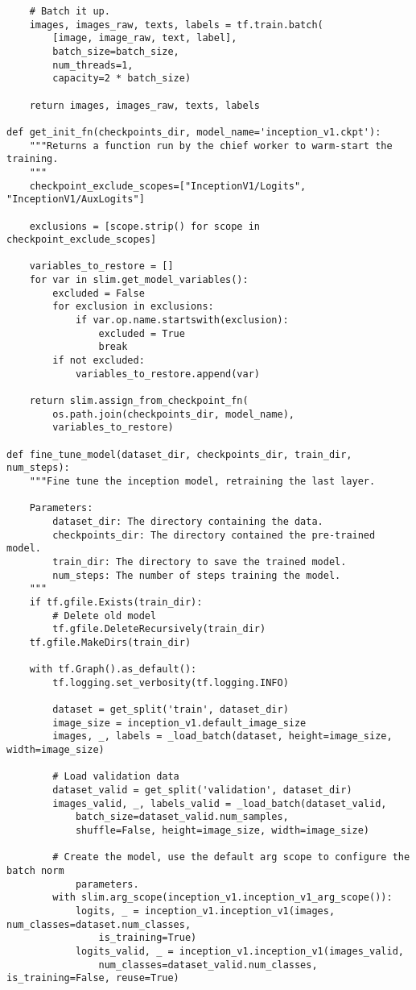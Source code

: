 \begin{lstlisting}
    # Batch it up.
    images, images_raw, texts, labels = tf.train.batch(
        [image, image_raw, text, label],
        batch_size=batch_size,
        num_threads=1,
        capacity=2 * batch_size)
    
    return images, images_raw, texts, labels

def get_init_fn(checkpoints_dir, model_name='inception_v1.ckpt'):
    """Returns a function run by the chief worker to warm-start the training.
    """
    checkpoint_exclude_scopes=["InceptionV1/Logits", "InceptionV1/AuxLogits"]
    
    exclusions = [scope.strip() for scope in checkpoint_exclude_scopes]

    variables_to_restore = []
    for var in slim.get_model_variables():
        excluded = False
        for exclusion in exclusions:
            if var.op.name.startswith(exclusion):
                excluded = True
                break
        if not excluded:
            variables_to_restore.append(var)

    return slim.assign_from_checkpoint_fn(
        os.path.join(checkpoints_dir, model_name),
        variables_to_restore)

def fine_tune_model(dataset_dir, checkpoints_dir, train_dir, num_steps):
    """Fine tune the inception model, retraining the last layer.

    Parameters:
        dataset_dir: The directory containing the data.
        checkpoints_dir: The directory contained the pre-trained model.
        train_dir: The directory to save the trained model.
        num_steps: The number of steps training the model.
    """
    if tf.gfile.Exists(train_dir):
        # Delete old model
        tf.gfile.DeleteRecursively(train_dir)
    tf.gfile.MakeDirs(train_dir)

    with tf.Graph().as_default():
        tf.logging.set_verbosity(tf.logging.INFO)
        
        dataset = get_split('train', dataset_dir)
        image_size = inception_v1.default_image_size
        images, _, labels = _load_batch(dataset, height=image_size, width=image_size)

        # Load validation data
        dataset_valid = get_split('validation', dataset_dir)
        images_valid, _, labels_valid = _load_batch(dataset_valid, 
            batch_size=dataset_valid.num_samples, 
            shuffle=False, height=image_size, width=image_size)
        
        # Create the model, use the default arg scope to configure the batch norm 
            parameters.
        with slim.arg_scope(inception_v1.inception_v1_arg_scope()):
            logits, _ = inception_v1.inception_v1(images, num_classes=dataset.num_classes, 
                is_training=True)
            logits_valid, _ = inception_v1.inception_v1(images_valid, 
                num_classes=dataset_valid.num_classes, is_training=False, reuse=True)
            

\end{lstlisting}
